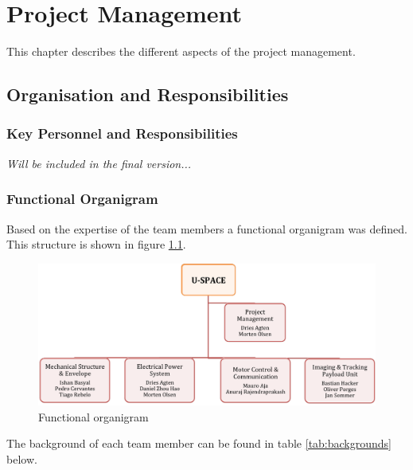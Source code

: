 \chapter{Project Management}
\label{chap:project_management}

This chapter describes the different aspects of the project management.

\section{Organisation and Responsibilities}

\subsection{Key Personnel and Responsibilities}

\textit{Will be included in the final version...}

\subsection{Functional Organigram}

Based on the expertise of the team members a functional organigram was defined. This structure is shown in figure \ref{fig:obs}.

\begin{figure}[bht]
\centering
\includegraphics[width = \textwidth]{figures/obs.png} %
\caption{Functional organigram}
\label{fig:obs}
\end{figure}

\noindent
The background of each team member can be found in table \ref{tab:backgrounds} below.

